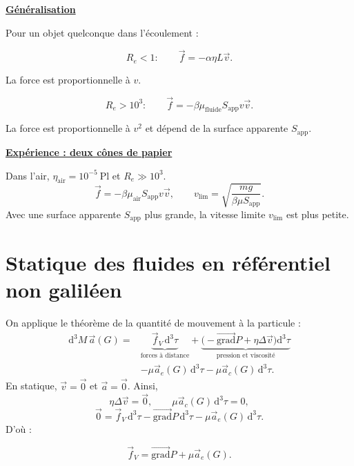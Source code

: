 \documentclass[11pt,a4paper]{article}
\newcommand{\dd}{\mathrm d}
\newcommand{\vv}{\vec v}
\newcommand{\grad}{\overrightarrow{\mathrm{grad}}}
\newcommand{\titr}[1]{\par\needspace{4\baselineskip}\textbf{\underline{#1}}\par}
\newcommand{\repere}[1]{\draw[->] (0,0)--(.8,0);\draw[->] (0,0)--(0,.8);\draw[->] (0,0)--(-.45,-.5);\node[below right] at (.15,-.1){$#1$};}
\begin{document}
\par{}
\par\textbf{\underline{Généralisation}}\par
Pour un objet quelconque dans l'écoulement :
\begin{cadre}\[R_e<1:\qquad\vec f=-\alpha\eta L\vv.\]\end{cadre}
La force est proportionnelle à $v$.\par{}
\begin{cadre}\[R_e>10^3:\qquad\vec f=-\beta\mu_{\mathrm{fluide}}S_{\mathrm{app}}v\vv.\]\end{cadre}
La force est proportionnelle à $v^2$ et dépend de la surface apparente $S_{\mathrm{app}}$.\par{}
\begin{exemple}
\titr{Expérience : deux cônes de papier}
Dans l'air, $\eta_{\mathrm{air}}=10^{-5}\ \mathrm{Pl}$ et $R_e\gg10^3$.
\[\vec f=-\beta\mu_{\mathrm{air}}S_{\mathrm{app}}v\vv,\qquad
v_{\mathrm{lim}}=\sqrt{\frac{mg}{\beta\mu S_{\mathrm{app}}}}.\]
Avec une surface apparente $S_{\mathrm{app}}$ plus grande, la vitesse limite $v_{\mathrm{lim}}$ est plus petite.
\end{exemple}
\setcounter{section}{4}
\section{Statique des fluides en référentiel non galiléen}
\begin{center}\end{center}
On applique le théorème de la quantité de mouvement à la particule :
\[\begin{aligned}
\dd^3M\,\vec a(G)={}&\underbrace{\vec f_V\,\dd^3\tau}_{\text{forces à distance}}
+\underbrace{\bigl(-\grad P+\eta\Delta\vv\bigr)\dd^3\tau}_{\text{pression et viscosité}}\\
&-\mu\vec a_e(G)\,\dd^3\tau-\mu\vec a_c(G)\,\dd^3\tau.
\end{aligned}\]
En statique, $\vv=\vec0$ et $\vec a=\vec0$. Ainsi,
\[\eta\Delta\vv=\vec0,\qquad\mu\vec a_c(G)\,\dd^3\tau=0,\]
\[\vec0=\vec f_V\,\dd^3\tau-\grad P\,\dd^3\tau-\mu\vec a_e(G)\,\dd^3\tau.\]
D'où :
\begin{cadre}\[\vec f_V=\grad P+\mu\vec a_e(G).\]\end{cadre}
\end{document}
